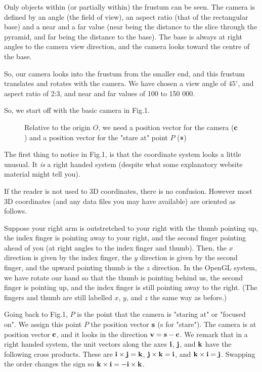 \documentclass[12pt]{article}
\begin{document}
Only objects within
(or partially within) the frustum can be seen. The camera is defined
by an angle (the field of view), an aspect ratio (that of the rectangular base)
 and a near and a far value (near being the distance to the slice through
the pyramid, and far being the distance to the base). The base is always
at right angles to the camera view direction, and the camera looks toward the centre
of the base.

So, our camera looks into the  frustum from 
the smaller end, and this
frustum translates and rotates with the camera. 
We have chosen a view angle of $45^\circ$, and aspect ratio of 2:3,
and near and far values of 100 to 150 000.

So, we start off with the basic
camera in Fig.1.
\begin{figure}[htb]
\vspace*{10cm}
\caption{ 
Relative to the origin $O$, we need a position vector 
for the camera (${\bf c}$) and
a position vector for the "stare at" point $P$ (${\bf s}$)
}
\end{figure}

The first thing to notice in Fig.1,  is that the coordinate system
looks a little unusual. It {\it is} a right handed system
(despite what some explanatory website material might tell you).

If the reader is not used to 3D coordinates, there is no confusion. However
most 3D coordinates (and any  data files you may have available) are oriented
 as follows.

 Suppose your right arm is outstretched to your right with 
the thumb pointing up, the index finger is  pointing away to your right, and
 the second finger
pointing  ahead of you (at right angles to the index finger and thumb). Then,
the $x$ direction is given by the index finger, the $y$ direction is
given by the second finger, and the upward pointing thumb is the $z$ direction.
In the OpenGL system, we have rotate our hand so that the thumb is pointing
behind us, the second finger is pointing  up, and the index finger is still pointing away 
to the right. (The fingers and thumb are still labelled $x$, $y$, and $z$ the
same way as before.)


Going back to Fig.1,  $P$ is the point that the camera is "staring at"
or "focused on". 
We assign this point $P$ the position vector $\bf s$
 (s for "stare").
The camera is at position vector $\bf c$, and it looks
in the direction $\bf v= s-c$. We remark that in a right handed
system, the unit vectors along the axes $\bf i$, $\bf j$, and $\bf k$
have the following cross products. These are $ {\bf i} \times {\bf j}={\bf k}$,
$ {\bf j} \times {\bf k}={\bf i}$, and $ {\bf k} \times {\bf i}={\bf j}$.
Swapping the order changes the sign so 
$ {\bf k} \times {\bf i}= -{\bf i} \times {\bf k}$. 
\end{document}
